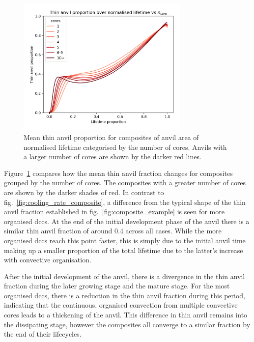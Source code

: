 \begin{figure}[tp]
    \centering
    \includegraphics[width=0.75\textwidth]{figures/chapter3_14.png}
    \caption[
    Mean thin anvil proportion for composites of anvil area of normalised lifetime categorised by the number of cores
    ]{
    Mean thin anvil proportion for composites of anvil area of normalised lifetime categorised by the number of cores. Anvils with a larger number of cores are shown by the darker red lines.
    }
    \label{fig:number_of_cores_composite}
\end{figure}

Figure~\ref{fig:number_of_cores_composite} compares how the mean thin anvil fraction changes for composites grouped by the number of cores.
The composites with a greater number of cores are shown by the darker shades of red.
In contrast to fig.~\ref{fig:cooling_rate_composite}, a difference from the typical shape of the thin anvil fraction established in fig.~\ref{fig:composite_example} is seen for more organised \acrshort{dcc}s.
At the end of the initial development phase of the anvil there is a similar thin anvil fraction of around 0.4 across all cases.
While the more organised \acrshort{dcc}s reach this point faster, this is simply due to the initial anvil time making up a smaller proportion of the total lifetime due to the latter's increase with convective organisation.

After the initial development of the anvil, there is a divergence in the thin anvil fraction during the later growing stage and the mature stage.
For the most organised \acrshort{dcc}s, there is a reduction in the thin anvil fraction during this period, indicating that the continuous, organised convection from multiple convective cores leads to a thickening of the anvil.
This difference in thin anvil remains into the dissipating stage, however the composites all converge to a similar fraction by the end of their lifecycles.

